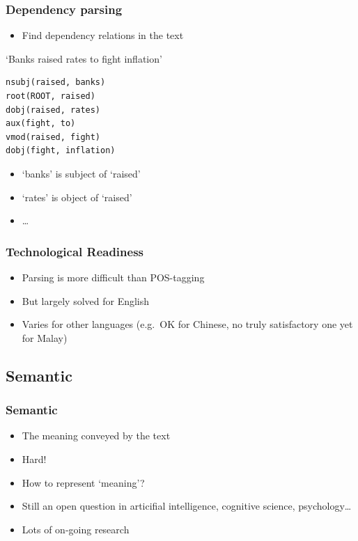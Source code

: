 \begin{frame}[fragile]
\frametitle{Dependency parsing}

\begin{itemize}
\item Find dependency relations in the text
\end{itemize}

\begin{multicols}{2}
`Banks raised rates to fight inflation'

{\small
\begin{verbatim}
nsubj(raised, banks)
root(ROOT, raised)
dobj(raised, rates)
aux(fight, to)
vmod(raised, fight)
dobj(fight, inflation)
\end{verbatim}
}


\pause

\begin{itemize}
\item `banks' is subject of `raised'
\item `rates' is object of `raised'
\item \ldots
\end{itemize}

\end{multicols}

\end{frame}


\begin{frame}
\frametitle{Technological Readiness}
    
\begin{itemize}
\item Parsing is more difficult than POS-tagging
\item But largely solved for English
\item Varies for other languages (e.g.~OK for Chinese, no truly satisfactory one yet for Malay)
\end{itemize}

\end{frame}

\subsection{Semantic}

\begin{frame}
\frametitle{Semantic}

\begin{itemize}
\item The meaning conveyed by the text
\item Hard!
\item How to represent `meaning'?
\item Still an open question in articifial intelligence, cognitive science, psychology\ldots
\item Lots of on-going research
\end{itemize} 

\end{frame}


